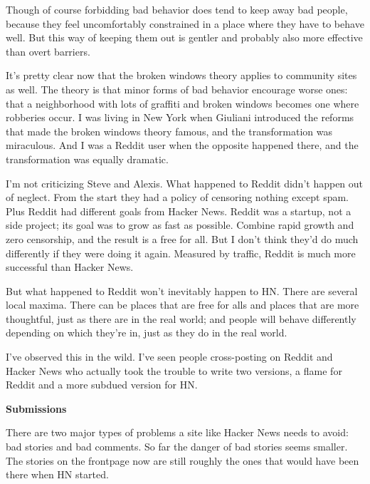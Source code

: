 Though
                  of course forbidding bad behavior does tend to keep away bad
                  people, because they feel uncomfortably constrained in a place
                  where they have to behave well. But this way of keeping them
                  out is gentler and probably also more effective than overt
                  barriers.

It's pretty clear now that the broken
                  windows theory applies to community sites as well. The theory
                  is that minor forms of bad behavior encourage worse ones: that
                  a neighborhood with lots of graffiti and broken windows
                  becomes one where robberies occur. I was living in New York
                  when Giuliani introduced the reforms that made the broken
                  windows theory famous, and the transformation was miraculous.
                  And I was a Reddit user when the opposite happened there, and
                  the transformation was equally dramatic.

I'm not
                  criticizing Steve and Alexis. What happened to Reddit didn't
                  happen out of neglect. From the start they had a policy of
                  censoring nothing except spam. Plus Reddit had different goals
                  from Hacker News. Reddit was a startup, not a side project;
                  its goal was to grow as fast as possible. Combine rapid growth
                  and zero censorship, and the result is a free for all. But I
                  don't think they'd do much differently if they were doing it
                  again. Measured by traffic, Reddit is much more successful
                  than Hacker News.

But what happened to Reddit won't
                  inevitably happen to HN. There are several local maxima. There
                  can be places that are free for alls and places that are more
                  thoughtful, just as there are in the real world; and people
                  will behave differently depending on which they're in, just as
                  they do in the real world.

I've observed this in
                  the wild. I've seen people cross-posting on Reddit and Hacker
                  News who actually took the trouble to write two versions, a
                  flame for Reddit and a more subdued version for HN.

\textbf{Submissions}

There are two major types of problems a site like
                  Hacker News needs to avoid: bad stories and bad comments. So
                  far the danger of bad stories seems smaller. The stories on
                  the frontpage now are still roughly the ones that would have
                  been there when HN started.

